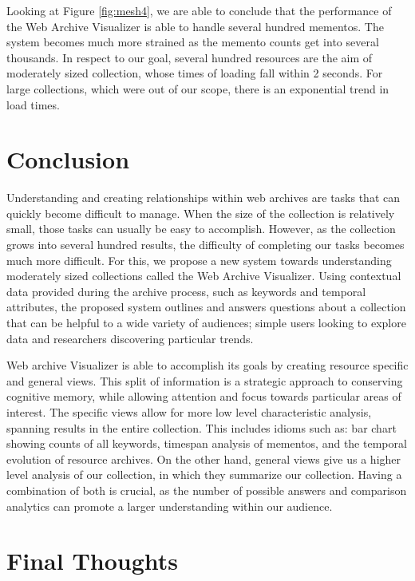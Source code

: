 \documentclass[10pt,journal,compsoc]{IEEEtran}
\begin{document}
Looking at Figure \ref{fig:mesh4}, we are able to conclude that the performance of the Web Archive Visualizer is able to handle several hundred mementos. The system becomes much more strained as the memento counts get into several thousands. In respect to our goal, several hundred resources are the aim of moderately sized collection, whose times of loading fall within 2 seconds. For large collections, which were out of our scope, there is an exponential trend in load times. \par

\section{Conclusion}
Understanding and creating relationships within web archives are tasks that can quickly become difficult to manage. When the size of the collection is relatively small, those tasks can usually be easy to accomplish. However, as the collection grows into several hundred results, the difficulty of completing our tasks becomes much more difficult. For this, we propose a new system towards understanding moderately sized collections called the Web Archive Visualizer. Using contextual data provided during the archive process, such as keywords and temporal attributes, the proposed system outlines and answers questions about a collection that can be helpful to a wide variety of audiences; simple users looking to explore data and researchers discovering particular trends. \par

Web archive Visualizer is able to accomplish its goals by creating resource specific and general views. This split of information is a strategic approach to conserving cognitive memory, while allowing attention and focus towards particular areas of interest. The specific views allow for more low level characteristic analysis, spanning results in the entire collection. This includes idioms such as: bar chart showing counts of all keywords, timespan analysis of mementos, and the temporal evolution of resource archives. On the other hand, general views give us a higher level analysis of our collection, in which they summarize our collection. Having a combination of both is crucial, as the number of possible answers and comparison analytics can promote a larger understanding within our audience. \par

\section{Final Thoughts}
\end{document}
